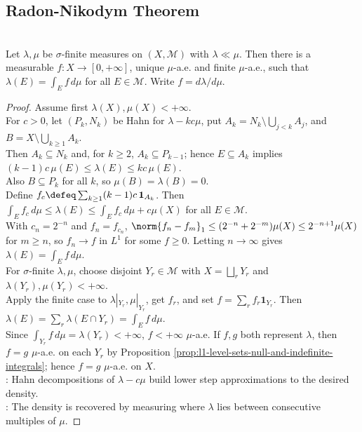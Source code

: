 \subsection{Radon-Nikodym Theorem}

\begin{theorem} \label{thm:radon-nikodym-sigma-finite} \\
Let $\lambda,\mu$ be $\sigma$-finite measures on $(X,\mathcal{M})$ with $\lambda\ll\mu$. Then there is a measurable $f:X\to[0,+\infty]$, unique $\mu$-a.e. and finite $\mu$-a.e., such that $\lambda(E)=\int_Ef\,d\mu$ for all $E\in\mathcal{M}$. Write $f=d\lambda/d\mu$.
\begin{proof}
Assume first $\lambda(X),\mu(X)<+\infty$.\\
For $c>0$, let $(P_k,N_k)$ be Hahn for $\lambda-kc\mu$, put $A_k=N_k\setminus\bigcup_{j<k}A_j$, and $B=X\setminus\bigcup_{k\geq1}A_k$.\\
Then $A_k\subseteq N_k$ and, for $k\geq2$, $A_k\subseteq P_{k-1}$; hence $E\subseteq A_k$ implies $(k-1)c\,\mu(E)\leq\lambda(E)\leq kc\,\mu(E)$.\\
Also $B\subseteq P_k$ for all $k$, so $\mu(B)=\lambda(B)=0$.\\
Define $f_c\defeq\sum_{k\geq1}(k-1)c\,\mathbf{1}_{A_k}$. Then $\int_E f_c\,d\mu\leq\lambda(E)\leq\int_E f_c\,d\mu+c\mu(X)$ for all $E\in\mathcal{M}$.\\
With $c_n=2^{-n}$ and $f_n=f_{c_n}$, $\norm{f_n-f_m}_1\leq(2^{-n}+2^{-m})\mu(X)\leq2^{-n+1}\mu(X)$ for $m\geq n$, so $f_n\to f$ in $L^1$ for some $f\geq0$. Letting $n\to\infty$ gives $\lambda(E)=\int_Ef\,d\mu$.\\
For $\sigma$-finite $\lambda,\mu$, choose disjoint $Y_r\in\mathcal{M}$ with $X=\bigsqcup_rY_r$ and $\lambda(Y_r),\mu(Y_r)<+\infty$.\\
Apply the finite case to $\lambda|_{Y_r},\mu|_{Y_r}$, get $f_r$, and set $f=\sum_r f_r\mathbf{1}_{Y_r}$. Then $\lambda(E)=\sum_r\lambda(E\cap Y_r)=\int_Ef\,d\mu$.\\
Since $\int_{Y_r}f\,d\mu=\lambda(Y_r)<+\infty$, $f<+\infty$ $\mu$-a.e. If $f,g$ both represent $\lambda$, then $f=g$ $\mu$-a.e. on each $Y_r$ by Proposition \ref{prop:l1-level-sets-null-and-indefinite-integrals}; hence $f=g$ $\mu$-a.e. on $X$.\\
: Hahn decompositions of $\lambda-c\mu$ build lower step approximations to the desired density.\\
: The density is recovered by measuring where $\lambda$ lies between consecutive multiples of $\mu$.
\end{proof}
\end{theorem}

